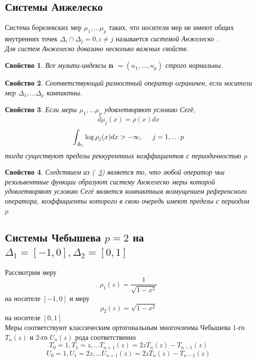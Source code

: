 \documentclass[12pt, a4paper]{report}
\newtheorem{prope}{Свойство} [chapter]
\begin{document}
\subsection {Системы Анжелеско}
Система борелевских мер $\mu_1,\ldots \mu_p$ таких, что носители мер не имеют
общих внутренних точек ${\Delta_i}\cap{\Delta_j} = 0, i\not=j $ называется \it системой Анжелеско \rm. \\
Для систем Анжелеско доказано несколько важных свойств.
\begin{prope}
Все мульти-индексы $\bf n \rm$ $=(n_1,\ldots,n_p)$ строго нормальны.
\end{prope}
\begin{prope}
Соответствующий разностный оператор ограничен, если носители мер $\Delta_1, \ldots \Delta_p$ компактны.
\end{prope}
\begin{prope}
\label{Angelesco.limits}
Если меры $\mu_1, \ldots \mu_p$ удовлетворяют условию Сег\"{е}, 
$$
d\mu_j(x)=\rho(x)dx
$$
$$
\int_{\Delta_j} \log \rho_j(x) dx > - \infty, \hspace{0.5cm} j=1,\ldots p
$$
тогда существуют пределы реккурентных коэффициентов с периодичностью $p$  
\end{prope}
\begin{prope}
Следствием из (~\ref{Angelesco.limits}) является то, что любой оператор чьи резольвентные функции образуют систему Анжелеско меры которой удовлетворяют условию Сег\"{е} является компактным возмущением референсного оператора, коэффициенты которого в свою очередь имеют пределы с периодом $p$ 
\end{prope}



\newpage
\subsection {Системы Чебышева $p=2$ на $\Delta_1=[-1,0], \Delta_2 =[0,1]$}
Рассмотрим меру $$\rho_1(z)=\displaystyle\frac{1}{\sqrt{1-x^2}}$$ на носителе  $[-1,0]$ и меру $$\rho_2(z)=\sqrt{1-x^2}$$ на носителе $[0,1]$ \\
Меры соответствуют классическим ортогональным многочленма Чебышева 1-го $T_n(z)$ и 2-го $U_n(z)$ рода соответственно
$$
T_0 = 1, T_1=z, \ldots T_{n+1}(z)=2zT_n(z)-T_{n-1}(z)
$$
$$
U_0 = 1, U_1=2z, \ldots U_{n+1}(z)=2zT_n(z)-T_{n-1}(z)
$$
\end{document}
